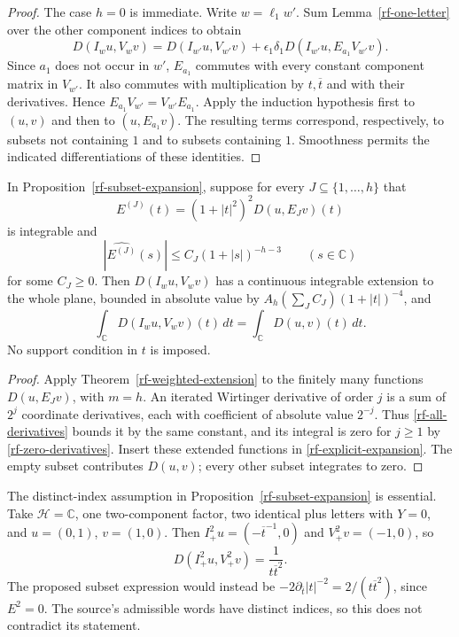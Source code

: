 \begin{proof}
The case $h=0$ is immediate.  Write $w=\ell_1w'$.
Sum Lemma~\ref{rf-one-letter} over the other component
indices to obtain
\[
 D(I_wu,V_wv)=D(I_{w'}u,V_{w'}v)
     +\epsilon_1\delta_1
          D(I_{w'}u,E_{a_1}V_{w'}v).
\]
Since $a_1$ does not occur in $w'$, $E_{a_1}$ commutes
with every constant component matrix in $V_{w'}$.
It also commutes with multiplication by $t,\overline t$
and with their derivatives.  Hence
$E_{a_1}V_{w'}=V_{w'}E_{a_1}$.
Apply the induction hypothesis first to $(u,v)$ and
then to $(u,E_{a_1}v)$.  The resulting terms correspond,
respectively, to subsets not containing $1$ and to
subsets containing $1$.  Smoothness permits the
indicated differentiations of these identities.
\end{proof}

\begin{theorem}\label{rf-noncompact-step}
In Proposition~\ref{rf-subset-expansion}, suppose for every
$J\subseteq\{1,\ldots,h\}$ that
\[
 E^{(J)}(t)=(1+|t|^2)^2D(u,E_Jv)(t)
\]
is integrable and
\[
             |\widehat {E^{(J)}}(s)|
                    \leq C_J(1+|s|)^{-h-3}
                    \qquad(s\in\mathbb C)
\]
for some $C_J\geq0$.
Then $D(I_wu,V_wv)$ has a continuous integrable extension
to the whole plane, bounded in absolute value by
$A_h(\sum_J C_J)(1+|t|)^{-4}$, and
\begin{equation}\label{rf-full-plane-identity}
       \int_{\mathbb C}D(I_wu,V_wv)(t)\,dt
                       =\int_{\mathbb C}D(u,v)(t)\,dt.
\end{equation}
No support condition in $t$ is imposed.
\end{theorem}

\begin{proof}
Apply Theorem~\ref{rf-weighted-extension} to the finitely
many functions $D(u,E_Jv)$, with $m=h$.
An iterated Wirtinger derivative of order $j$ is a sum
of $2^j$ coordinate derivatives, each with coefficient
of absolute value $2^{-j}$.  Thus \eqref{rf-all-derivatives}
bounds it by the same constant, and its integral is
zero for $j\geq1$ by \eqref{rf-zero-derivatives}.
Insert these extended functions in
\eqref{rf-explicit-expansion}.  The empty subset contributes
$D(u,v)$; every other subset integrates to zero.
\end{proof}

\begin{example}\label{rf-repeated-index}
The distinct-index assumption in
Proposition~\ref{rf-subset-expansion} is essential.
Take $\mathcal H=\mathbb C$, one two-component factor,
two identical plus letters with $Y=0$, and
$u=(0,1)$, $v=(1,0)$.
Then $I_+^2u=(-\overline t^{-1},0)$ and
$V_+^2v=(-1,0)$, so
\[
                D(I_+^2u,V_+^2v)=\frac1{t\overline t^2}.
\]
The proposed subset expression would instead be
$-2\partial_{\overline t}|t|^{-2}
       =2/(t\overline t^2)$, since $E^2=0$.
The source's admissible words have distinct indices,
so this does not contradict its statement.
\end{example}


